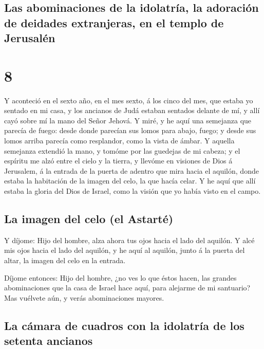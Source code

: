 \hypertarget{las-abominaciones-de-la-idolatruxeda-la-adoraciuxf3n-de-deidades-extranjeras-en-el-templo-de-jerusaluxe9n}{%
\subsection{Las abominaciones de la idolatría, la adoración de deidades
extranjeras, en el templo de
Jerusalén}\label{las-abominaciones-de-la-idolatruxeda-la-adoraciuxf3n-de-deidades-extranjeras-en-el-templo-de-jerusaluxe9n}}

\hypertarget{section-7}{%
\section{8}\label{section-7}}

 Y aconteció en el sexto año, en el mes sexto, á los cinco
del mes, que estaba yo sentado en mi casa, y los ancianos de Judá
estaban sentados delante de mí, y allí cayó sobre mí la mano del Señor
Jehová.  Y miré, y he aquí una semejanza que parecía de
fuego: desde donde parecían sus lomos para abajo, fuego; y desde sus
lomos arriba parecía como resplandor, como la vista de ámbar.
 Y aquella semejanza extendió la mano, y tomóme por las
guedejas de mi cabeza; y el espíritu me alzó entre el cielo y la tierra,
y llevóme en visiones de Dios á Jerusalem, á la entrada de la puerta de
adentro que mira hacia el aquilón, donde estaba la habitación de la
imagen del celo, la que hacía celar.  Y he aquí que allí
estaba la gloria del Dios de Israel, como la visión que yo había visto
en el campo.

\hypertarget{la-imagen-del-celo-el-astartuxe9}{%
\subsection{La imagen del celo (el
Astarté)}\label{la-imagen-del-celo-el-astartuxe9}}

 Y díjome: Hijo del hombre, alza ahora tus ojos hacia el
lado del aquilón. Y alcé mis ojos hacia el lado del aquilón, y he aquí
al aquilón, junto á la puerta del altar, la imagen del celo en la
entrada.

 Díjome entonces: Hijo del hombre, ¿no ves lo que éstos
hacen, las grandes abominaciones que la casa de Israel hace aquí, para
alejarme de mi santuario? Mas vuélvete aún, y verás abominaciones
mayores.

\hypertarget{la-cuxe1mara-de-cuadros-con-la-idolatruxeda-de-los-setenta-ancianos}{%
\subsection{La cámara de cuadros con la idolatría de los setenta
ancianos}\label{la-cuxe1mara-de-cuadros-con-la-idolatruxeda-de-los-setenta-ancianos}}

